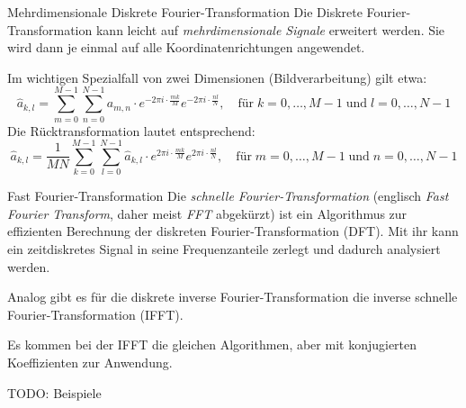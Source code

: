 \begin{defi}{Mehrdimensionale Diskrete Fourier-Transformation}
    Die Diskrete Fourier-Transformation kann leicht auf \emph{mehrdimensionale Signale} erweitert werden.
    Sie wird dann je einmal auf alle Koordinatenrichtungen angewendet.

    Im wichtigen Spezialfall von zwei Dimensionen (Bildverarbeitung) gilt etwa:
    \[
        \hat{a}_{k,l} = \sum_{m=0}^{M-1} \sum_{n=0}^{N-1} a_{m,n} \cdot e^{-2\pi i \cdot \frac {mk}{M}} e^{-2\pi i \cdot \frac {nl}{N}}, \quad \text{für} \; k = 0, \ldots, M-1 \; \text{und} \;  l = 0, \ldots, N-1
    \]
    Die Rücktransformation lautet entsprechend:
    \[
        \hat{a}_{k,l} = \frac{1}{MN} \sum_{k=0}^{M-1} \sum_{l=0}^{N-1} \hat{a}_{k,l} \cdot e^{2\pi i \cdot \frac {mk}{M}} e^{2\pi i \cdot \frac {nl}{N}}, \quad \text{für} \; m = 0, \ldots, M-1 \; \text{und} \;  n = 0, \ldots, N-1
    \]
\end{defi}

\begin{bonus}{Fast Fourier-Transformation}
    Die \emph{schnelle Fourier-Transformation} (englisch \emph{Fast Fourier Transform}, daher meist \emph{FFT} abgekürzt) ist ein Algorithmus zur effizienten Berechnung der diskreten Fourier-Transformation (DFT).
    Mit ihr kann ein zeitdiskretes Signal in seine Frequenzanteile zerlegt und dadurch analysiert werden.

    Analog gibt es für die diskrete inverse Fourier-Transformation die inverse schnelle Fourier-Transformation (IFFT).

    Es kommen bei der IFFT die gleichen Algorithmen, aber mit konjugierten Koeffizienten zur Anwendung.
\end{bonus}

TODO: Beispiele

